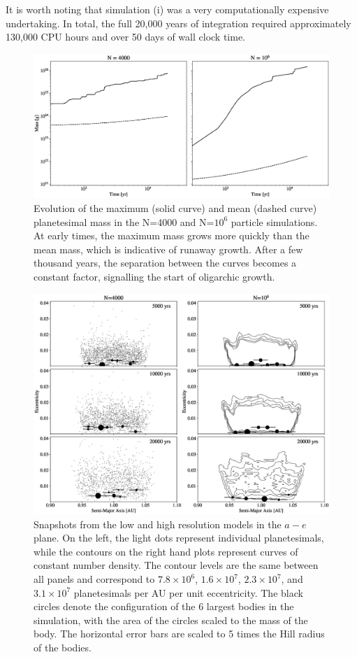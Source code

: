 It is worth noting that simulation (i) was a very computationally expensive undertaking. In total, the full 20,000 years of 
integration required approximately 130,000 CPU hours and over 50 days of wall clock time.

\begin{figure}
    \includegraphics[width=\textwidth]{figures/plSS/mass_evo.eps}
    \caption{Evolution of the maximum (solid curve) and mean (dashed curve) planetesimal mass in the N=4000 and N=$10^6$ particle simulations. At early times, the maximum mass grows more quickly than the mean mass, which is indicative of runaway growth. After a few thousand years, the separation between the curves becomes a constant factor, signalling the start of oligarchic growth.
    \label{fig:mass_evo}}
\end{figure}

\begin{figure}
    \includegraphics[width=\textwidth]{figures/plSS/ecc_evo.eps}
    \caption{Snapshots from the low and high resolution models in the $a-e$ plane. On the left, the light dots represent individual planetesimals, while the contours on the right hand plots represent curves of constant number density. The contour levels are the same between all panels and correspond to $7.8 \times 10^6$, $1.6 \times 10^7$, $2.3 \times 10^7$, and $3.1 \times 10^7$ planetesimals per AU per unit eccentricity. The black circles denote the configuration of the 6 largest bodies in the simulation, with the area of the circles scaled to the mass of the body. The horizontal error bars are scaled to 5 times the Hill radius of the bodies.
    \label{fig:ae}}
\end{figure}

